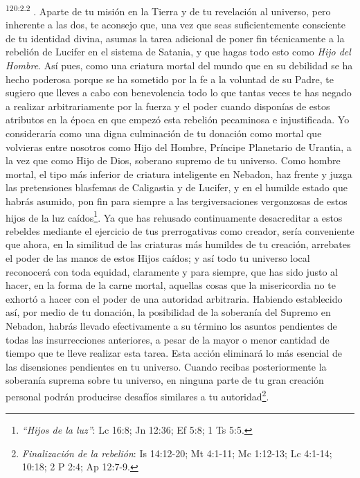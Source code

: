 \par 
\textsuperscript{120:2.2} . Aparte de tu misión en la Tierra y de tu revelación al universo, pero inherente a las dos, te aconsejo que, una vez que seas suficientemente consciente de tu identidad divina, asumas la tarea adicional de poner fin técnicamente a la rebelión de Lucifer en el sistema de Satania, y que hagas todo esto como \textit{Hijo del Hombre}. Así pues, como una criatura mortal del mundo que en su debilidad se ha hecho poderosa porque se ha sometido por la fe a la voluntad de su Padre, te sugiero que lleves a cabo con benevolencia todo lo que tantas veces te has negado a realizar arbitrariamente por la fuerza y el poder cuando disponías de estos atributos en la época en que empezó esta rebelión pecaminosa e injustificada. Yo consideraría como una digna culminación de tu donación como mortal que volvieras entre nosotros como Hijo del Hombre, Príncipe Planetario de Urantia, a la vez que como Hijo de Dios, soberano supremo de tu universo. Como hombre mortal, el tipo más inferior de criatura inteligente en Nebadon, haz frente y juzga las pretensiones blasfemas de Caligastia y de Lucifer, y en el humilde estado que habrás asumido, pon fin para siempre a las tergiversaciones vergonzosas de estos hijos de la luz caídos\footnote{\textit{``Hijos de la luz''}: Lc 16:8; Jn 12:36; Ef 5:8; 1 Ts 5:5.}. Ya que has rehusado continuamente desacreditar a estos rebeldes mediante el ejercicio de tus prerrogativas como creador, sería conveniente que ahora, en la similitud de las criaturas más humildes de tu creación, arrebates el poder de las manos de estos Hijos caídos; y así todo tu universo local reconocerá con toda equidad, claramente y para siempre, que has sido justo al hacer, en la forma de la carne mortal, aquellas cosas que la misericordia no te exhortó a hacer con el poder de una autoridad arbitraria. Habiendo establecido así, por medio de tu donación, la posibilidad de la soberanía del Supremo en Nebadon, habrás llevado efectivamente a su término los asuntos pendientes de todas las insurrecciones anteriores, a pesar de la mayor o menor cantidad de tiempo que te lleve realizar esta tarea. Esta acción eliminará lo más esencial de las disensiones pendientes en tu universo. Cuando recibas posteriormente la soberanía suprema sobre tu universo, en ninguna parte de tu gran creación personal podrán producirse desafíos similares a tu autoridad\guillemotright\footnote{\textit{Finalización de la rebelión}: Is 14:12-20; Mt 4:1-11; Mc 1:12-13; Lc 4:1-14; 10:18; 2 P 2:4; Ap 12:7-9.}.

